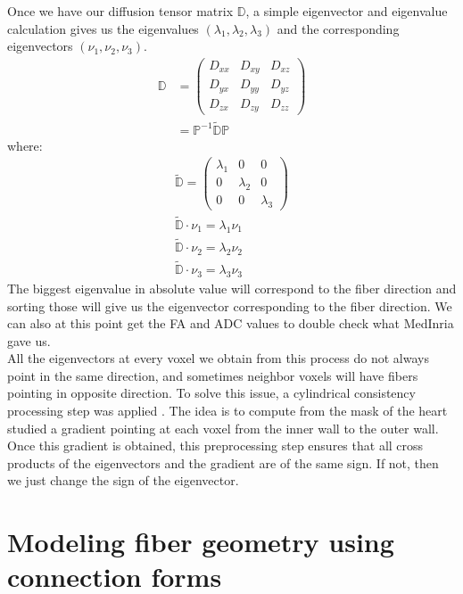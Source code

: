 Once we have our diffusion tensor matrix $\mathbb{D}$, a simple eigenvector and eigenvalue calculation gives us the eigenvalues $(\lambda_1, \lambda_2, \lambda_3)$ and the corresponding eigenvectors $(\nu_1, \nu_2, \nu_3)$.
\begin{align}
    \mathbb{D} &= \begin{pmatrix}
        D_{xx} & D_{xy} & D_{xz} \\
        D_{yx} & D_{yy} & D_{yz} \\
        D_{zx} & D_{zy} & D_{zz}
        \end{pmatrix} \\
    &= \mathbb{P}^{-1} \mathbb{\tilde{D}P}
\end{align}
where:
\begin{gather*}
    \mathbb{\tilde{D}} = \begin{pmatrix}
        \lambda_1 & 0 & 0 \\
        0 & \lambda_2 & 0 \\
        0 & 0 & \lambda_3
        \end{pmatrix} \\
    \mathbb{\tilde{D}}\cdot \nu_1 = \lambda_1 \nu_1 \\
    \mathbb{\tilde{D}}\cdot \nu_2 = \lambda_2 \nu_2 \\
    \mathbb{\tilde{D}}\cdot \nu_3 = \lambda_3 \nu_3
\end{gather*}
The biggest eigenvalue in absolute value will correspond to the fiber direction and sorting those will give us the eigenvector corresponding to the fiber direction. We can also at this point get the FA and ADC values to double check what MedInria gave us.\\
All the eigenvectors at every voxel we obtain from this process do not always point in the same direction, and sometimes neighbor voxels will have fibers pointing in opposite direction. To solve this issue, a cylindrical consistency processing step was applied \cite{pami2015}. The idea is to compute from the mask of the heart studied a gradient pointing at each voxel from the inner wall to the outer wall. Once this gradient is obtained, this preprocessing step ensures that all cross products of the eigenvectors and the gradient are of the same sign. If not, then we just change the sign of the eigenvector.

\section{Modeling fiber geometry using connection forms}

